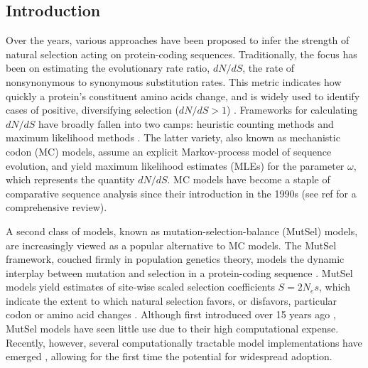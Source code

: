 \documentclass{pnastwo}
\begin{document}
\begin{article}

\section*{Introduction}

Over the years, various approaches have been proposed to infer the strength of natural selection acting on protein-coding sequences. Traditionally, the focus has been on estimating the evolutionary rate ratio, $dN/dS$, the rate of nonsynonymous to synonymous substitution rates. This metric indicates how quickly a protein's constituent amino acids change, and is widely used to identify cases of positive, diversifying selection ($dN/dS > 1$) \cite{NielsenYang1998, Yangetal2000, KosakovskyPondFrost2005b, Huelsenbecketal2006}. 
Frameworks for calculating $dN/dS$ have broadly fallen into two camps: heuristic counting methods \cite{LWL85,NG86,Pamilo1993,Ina1995,YN00} and maximum likelihood methods \cite{GoldmanYang1994,MuseGaut1994,NielsenYang1998,Yang2006}. The latter variety, also known as mechanistic codon (MC) models, assume an explicit Markov-process model of sequence evolution, and yield maximum likelihood estimates (MLEs) for the parameter $\omega$, which represents the quantity $dN/dS$. MC models have become a staple of comparative sequence analysis since their introduction in the 1990s (see ref \cite{Anisimova2009} for a comprehensive review).

A second class of models, known as mutation-selection-balance (MutSel) models, are increasingly viewed as a popular alternative to MC models. The MutSel framework, couched firmly in population genetics theory, models the dynamic interplay between mutation and selection in a protein-coding sequence \cite{HalpernBruno1998,Thorne2012}. MutSel models yield estimates of site-wise scaled selection coefficients $S=2N_es$, which indicate the extent to which natural selection favors, or disfavors, particular codon or amino acid changes \cite{HalpernBruno1998,YangNielsen2008,Rodrigueetal2010,Tamurietal2012,Tamurietal2014}. Although first introduced over 15 years ago \cite{HalpernBruno1998}, MutSel models have seen little use due to their high computational expense. Recently, however, several computationally tractable model implementations have emerged \cite{RodrigueLartillot2014,Tamurietal2014}, allowing for the first time the potential for widespread adoption. 


\end{article}
\end{document}
